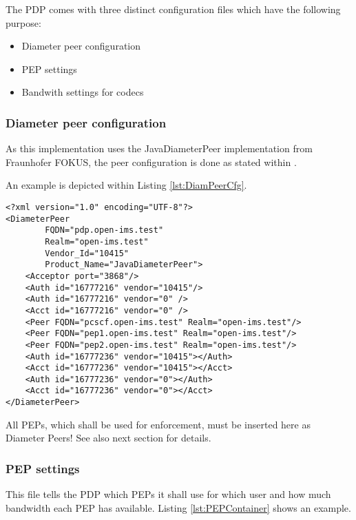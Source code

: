 The PDP comes with three distinct configuration files which have the following purpose:
\begin{itemize}
	\item Diameter peer configuration
	\item PEP settings
	\item Bandwith settings for codecs
\end{itemize}
\subsubsection{Diameter peer configuration}
As this implementation uses the JavaDiameterPeer implementation from Fraunhofer FOKUS, the peer configuration is done as stated within \cite{website:javaDiameterPeer}.

An example is depicted within Listing \ref{lst:DiamPeerCfg}.

\begin{lstlisting}[caption=Example of a Diameter Peer configuration file, label={lst:DiamPeerCfg}]
<?xml version="1.0" encoding="UTF-8"?>
<DiameterPeer
		FQDN="pdp.open-ims.test" 
		Realm="open-ims.test" 
		Vendor_Id="10415" 
		Product_Name="JavaDiameterPeer">
	<Acceptor port="3868"/>
	<Auth id="16777216" vendor="10415"/>
	<Auth id="16777216" vendor="0" />
	<Acct id="16777216" vendor="0" />
	<Peer FQDN="pcscf.open-ims.test" Realm="open-ims.test"/>
	<Peer FQDN="pep1.open-ims.test" Realm="open-ims.test"/>
	<Peer FQDN="pep2.open-ims.test" Realm="open-ims.test"/>
	<Auth id="16777236" vendor="10415"></Auth>
	<Acct id="16777236" vendor="10415"></Acct>
	<Auth id="16777236" vendor="0"></Auth>
	<Acct id="16777236" vendor="0"></Acct>
</DiameterPeer>
\end{lstlisting}

All PEPs, which shall be used for enforcement, must be inserted here as Diameter Peers!
See also next section for details.



\subsubsection{PEP settings}
This file tells the PDP which PEPs it shall use for which user and how much bandwidth each PEP has available.
Listing \ref{lst:PEPContainer} shows an example.

